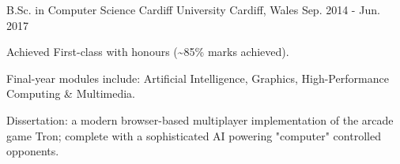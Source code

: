 \pagebreak


\begin{cventries}

  \cventry
    {B.Sc. in Computer Science} %
    {Cardiff University} %
    {Cardiff, Wales} %
    {Sep. 2014 - Jun. 2017} %
    {
      \begin{cvitems} %
        \item Achieved First-class with honours (\textasciitilde{}85\% marks achieved).
        \item Final-year modules include: Artificial Intelligence, Graphics, High-Performance Computing \& Multimedia.
        \item Dissertation: a modern browser-based multiplayer implementation of the arcade game Tron; complete with a sophisticated AI powering "computer" controlled opponents.
      \end{cvitems}
    }
    {}


\end{cventries}
